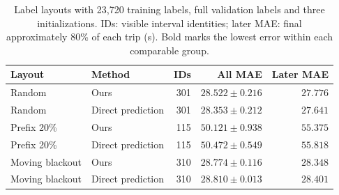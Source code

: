 \begin{table}[t]
\centering\footnotesize\setlength{\tabcolsep}{4pt}
\caption{Label layouts with 23,720 training labels, full validation labels and three initializations. IDs: visible interval identities; later MAE: final approximately 80\% of each trip (s). Bold marks the lowest error within each comparable group.}\label{tab:layout}
\begin{tabular}{llrrr}\toprule
Layout & Method & IDs & All MAE & Later MAE\\\midrule
Random & Ours & 301 & $28.522\pm0.216$ & $27.776$\\
Random & Direct prediction & 301 & $\mathbf{28.353\pm0.212}$ & $\mathbf{27.641}$\\
Prefix 20\% & Ours & 115 & $\mathbf{50.121\pm0.938}$ & $\mathbf{55.375}$\\
Prefix 20\% & Direct prediction & 115 & $50.472\pm0.549$ & $55.818$\\
Moving blackout & Ours & 310 & $\mathbf{28.774\pm0.116}$ & $\mathbf{28.348}$\\
Moving blackout & Direct prediction & 310 & $28.810\pm0.013$ & $28.401$\\
\bottomrule\end{tabular}
\end{table}
